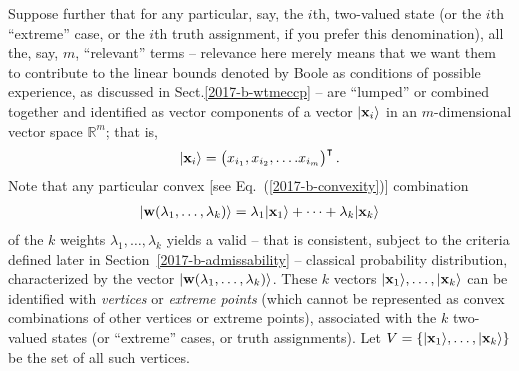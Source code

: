\documentclass[%
  twocolumn,
 showpacs,
 showkeys,
 preprintnumbers,
 amsmath,amssymb,
 aps,
  pra,
  longbibliography,
 floatfix,
 ]{revtex4-1}
\begin{document}
Suppose further that for any particular, say, the $i$th, two-valued state
(or the $i$th ``extreme'' case, or the $i$th truth assignment, if you prefer this denomination),
all the, say, $m$, ``relevant'' terms
--
relevance here merely means that we want them to contribute to the linear bounds
denoted by Boole as conditions of possible experience, as discussed in Sect.\ref{2017-b-wtmeccp} -- are ``lumped'' or combined together
and identified as vector components of a vector $\vert {\bf x}_i\rangle $
in an $m$-dimensional vector space $\mathbb{R}^m$; that is,
\begin{equation}
\begin{split}
\vert {\bf x}_i\rangle
=
\begin{pmatrix}
x_{i_1},
x_{i_2},
\ldots .
x_{i_m}
\end{pmatrix}^\intercal
.
\label{2017-b-vivector}
\end{split}
\end{equation}
Note that any particular convex [see Eq.~(\ref{2017-b-convexity})] combination
\begin{equation}
\begin{split}
\vert {\bf w} ( \lambda_1 ,\ldots , \lambda_k ) \rangle
=
\lambda_1 \vert  {\bf x}_1 \rangle  + \cdots + \lambda_k \vert  {\bf x}_k \rangle
\label{2017-b-cow}
\end{split}
\end{equation}
of the $k$ weights $\lambda_1, \ldots ,\lambda_k$
yields a valid -- that is consistent, subject to the criteria defined later in Section~\ref{2017-b-admissability} --
classical probability distribution, characterized by the vector $\vert {\bf w} ( \lambda_1 ,\ldots , \lambda_k ) \rangle  $.
These $k$ vectors
$\vert  {\bf x}_1 \rangle , \ldots , \vert  {\bf x}_k \rangle$
can be identified with
{\em vertices} or {\em extreme points}
(which cannot be represented as convex combinations of other vertices  or   extreme points),
 associated with the $k$ two-valued states  (or ``extreme'' cases, or truth assignments).
Let
$
V
=
\left\{
\vert  {\bf x}_1 \rangle , \ldots , \vert  {\bf x}_k \rangle
\right\}
$
be the set of all such vertices.
\end{document}
